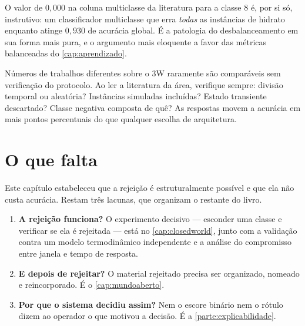 O valor de $0{,}000$ na coluna multiclasse da literatura para a classe 8 é, por si só,
instrutivo: um classificador multiclasse que erra \emph{todas} as instâncias de hidrato
enquanto atinge $0{,}930$ de acurácia global. É a patologia do desbalanceamento em sua
forma mais pura, e o argumento mais eloquente a favor das métricas balanceadas do
\cref{cap:aprendizado}.

\begin{destaque}
Números de trabalhos diferentes sobre o 3W raramente são comparáveis sem verificação do
protocolo. Ao ler a literatura da área, verifique sempre: divisão temporal ou aleatória?
Instâncias simuladas incluídas? Estado transiente descartado? Classe negativa composta
de quê? As respostas movem a acurácia em mais pontos percentuais do que qualquer escolha
de arquitetura.
\end{destaque}

\section{O que falta}

Este capítulo estabeleceu que a rejeição é estruturalmente possível e que ela não custa
acurácia. Restam três lacunas, que organizam o restante do livro.

\begin{enumerate}[leftmargin=*,itemsep=0.4em]

\item \textbf{A rejeição funciona?} O experimento decisivo --- esconder uma classe e
verificar se ela é rejeitada --- está no \cref{cap:closedworld}, junto com a validação
contra um modelo termodinâmico independente e a análise do compromisso entre janela e
tempo de resposta.

\item \textbf{E depois de rejeitar?} O material rejeitado precisa ser organizado,
nomeado e reincorporado. É o \cref{cap:mundoaberto}.

\item \textbf{Por que o sistema decidiu assim?} Nem o escore binário nem o rótulo dizem
ao operador o que motivou a decisão. É a \cref{parte:explicabilidade}.

\end{enumerate}

